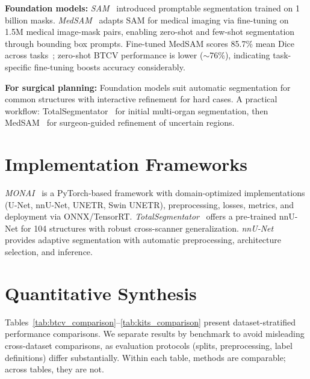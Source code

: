 \documentclass[conference]{IEEEtran}
\begin{document}
\textbf{Foundation models:} \emph{SAM}~\cite{kirillov2023sam} introduced promptable segmentation trained on 1 billion masks. \emph{MedSAM}~\cite{ma2024medsam} adapts SAM for medical imaging via fine-tuning on 1.5M medical image-mask pairs, enabling zero-shot and few-shot segmentation through bounding box prompts. Fine-tuned MedSAM scores 85.7\% mean Dice across tasks~\cite{ma2024medsam}; zero-shot BTCV performance is lower ($\sim$76\%), indicating task-specific fine-tuning boosts accuracy considerably.

\textbf{For surgical planning:} Foundation models suit automatic segmentation for common structures with interactive refinement for hard cases. A practical workflow: TotalSegmentator~\cite{wasserthal2023totalsegmentator} for initial multi-organ segmentation, then MedSAM~\cite{ma2024medsam} for surgeon-guided refinement of uncertain regions.

\section{Implementation Frameworks}
\label{sec:frameworks}

\emph{MONAI}~\cite{monai2022} is a PyTorch-based framework with domain-optimized implementations (U-Net, nnU-Net, UNETR, Swin UNETR), preprocessing, losses, metrics, and deployment via ONNX/TensorRT. \emph{TotalSegmentator}~\cite{wasserthal2023totalsegmentator} offers a pre-trained nnU-Net for 104 structures with robust cross-scanner generalization. \emph{nnU-Net}~\cite{isensee2021nnunet} provides adaptive segmentation with automatic preprocessing, architecture selection, and inference.

\FloatBarrier

\section{Quantitative Synthesis}
\label{sec:synthesis}

Tables~\ref{tab:btcv_comparison}--\ref{tab:kits_comparison} present dataset-stratified performance comparisons. We separate results by benchmark to avoid misleading cross-dataset comparisons, as evaluation protocols (splits, preprocessing, label definitions) differ substantially. Within each table, methods are comparable; across tables, they are not.
\end{document}
